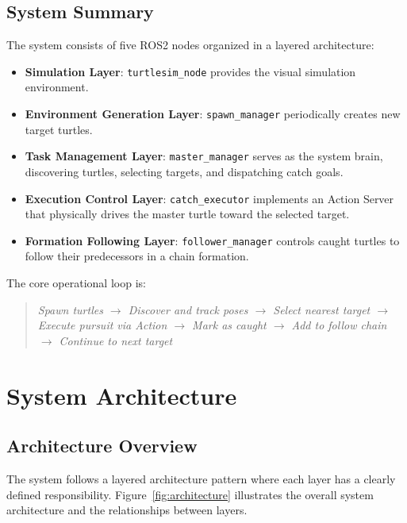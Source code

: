 \documentclass[12pt,a4paper]{article}
\begin{document}
\subsection{System Summary}

The system consists of five ROS2 nodes organized in a layered architecture:

\begin{itemize}
  \item \textbf{Simulation Layer}: \texttt{turtlesim\_node} provides the visual simulation environment.
  \item \textbf{Environment Generation Layer}: \texttt{spawn\_manager} periodically creates new target turtles.
  \item \textbf{Task Management Layer}: \texttt{master\_manager} serves as the system brain, discovering turtles, selecting targets, and dispatching catch goals.
  \item \textbf{Execution Control Layer}: \texttt{catch\_executor} implements an Action Server that physically drives the master turtle toward the selected target.
  \item \textbf{Formation Following Layer}: \texttt{follower\_manager} controls caught turtles to follow their predecessors in a chain formation.
\end{itemize}

The core operational loop is:

\begin{quote}
\textit{Spawn turtles $\rightarrow$ Discover and track poses $\rightarrow$ Select nearest target $\rightarrow$ Execute pursuit via Action $\rightarrow$ Mark as caught $\rightarrow$ Add to follow chain $\rightarrow$ Continue to next target}
\end{quote}

\section{System Architecture}
\label{sec:architecture}

\subsection{Architecture Overview}

The system follows a layered architecture pattern where each layer has a clearly defined responsibility. Figure~\ref{fig:architecture} illustrates the overall system architecture and the relationships between layers.
\end{document}
